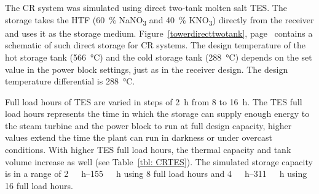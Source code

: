 The \ac{CR} system was simulated using direct two-tank molten salt \acf{TES}. The storage takes the \ac{HTF} (\SI{60}{\percent} NaNO\textsubscript{3} and \SI{40}{\percent} KNO\textsubscript{3}) directly from the receiver and uses it as the storage medium. Figure~\ref{towerdirecttwotank}, page~\pageref{towerdirecttwotank} contains a schematic of such direct storage for \ac{CR} systems. The design temperature of the hot storage tank (\SI{566}{\celsius}) and the cold storage tank (\SI{288}{\celsius}) depends on the set value in the power block settings, just as in the receiver design. The design temperature differential is \SI{288}{\celsius}.


Full load hours of \ac{TES} are varied in steps of \SI{2}{h} from 8 to \SI{16}{h}. The \ac{TES} full load hours represents the time in which the storage can supply enough energy to the steam turbine and the power block to run at full design capacity, higher values extend the time the plant can run in darkness or under overcast conditions. With higher \ac{TES} full load hours, the thermal capacity and tank volume increase as well (see Table~\ref{tbl: CRTES}). The simulated storage capacity is in a range of \SIrange{2}{155}{\mega\wattth\hour} using 8 full load hours and \SIrange{4}{311}{\mega\wattth\hour} using 16 full load hours.

